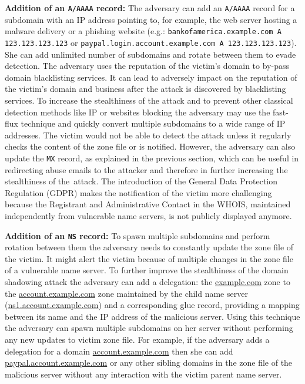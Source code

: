 \textbf{Addition of an \texttt{A/AAAA} record:} 
The adversary can add an \texttt{A/AAAA} record for a subdomain with an IP address pointing to, for example, the web server hosting a malware delivery or a phishing website (e.g.: \texttt{bankofamerica.example.com A 123.123.123.123} or \texttt{paypal.login.account.example.com A 123.123.123.123}). 
She can %
add unlimited number of subdomains and rotate between them to evade detection. 
The adversary uses the reputation of the victim's domain to by-pass domain blacklisting services. %
It can lead to adversely impact on the reputation of the victim's domain and business after the attack is discovered by %
blacklisting services.
To increase the stealthiness of the attack and to prevent other classical detection methods like IP or websites blocking the adversary may use the fast-flux technique and quickly convert multiple subdomains to a wide range of IP addresses.
The victim would not be able to detect the attack unless it regularly checks the content of the zone file or is notified. 
However, the adversary can also update the \texttt{MX} record, as explained in the previous section, which can be useful in redirecting abuse emails to the attacker and therefore in further increasing the stealthiness of the~attack. 
The introduction of the General Data Protection Regulation (GDPR) makes the notification of the victim more challenging because the Registrant and Administrative Contact in the WHOIS, maintained independently from vulnerable name servers, is not publicly displayed anymore.

\textbf{Addition of an \texttt{NS} record:} %
To spawn multiple subdomains and perform rotation between them the adversary needs to constantly update the zone file of the victim.
It might alert the victim because of multiple changes in the zone file of a vulnerable name server. 
To further improve the stealthiness of the domain shadowing  attack the adversary can add a delegation: the \url{example.com} zone to the \url{account.example.com} zone maintained by the child name server (\url{ns1.account.example.com}) and a corresponding glue record, providing a mapping between its name and the IP address of the malicious server.
Using this technique the adversary can spawn multiple subdomains on her server without performing any new updates to victim zone file.
For example, if the adversary adds a delegation for a domain
\url{account.example.com} %
then she can %
add \url{paypal.account.example.com} or any other sibling domains in the zone file of %
the malicious server without any interaction with the victim parent name server. 

